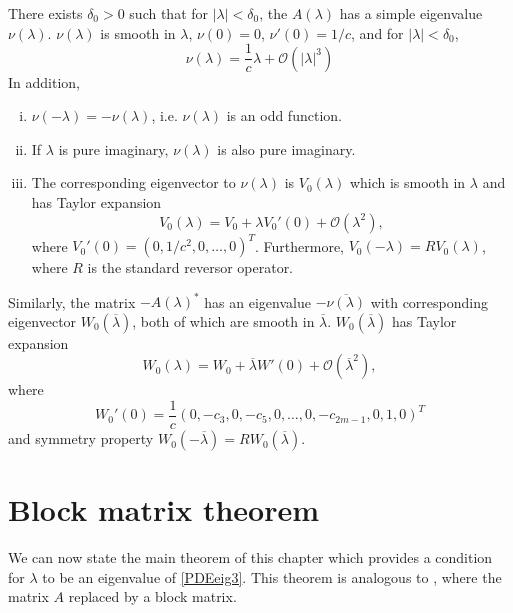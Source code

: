 \documentclass[thesis.tex]{subfiles}
\begin{document}

\begin{lemma}\label{nulambdalemma}
There exists $\delta_0 > 0$ such that for $|\lambda| < \delta_0$, the $A(\lambda)$ has a simple eigenvalue $\nu(\lambda)$. $\nu(\lambda)$ is smooth in $\lambda$, $\nu(0) = 0$, $\nu'(0) = 1/c$, and for $|\lambda| < \delta_0$,
\begin{equation}\label{nulambda}
\nu(\lambda) = \frac{1}{c} \lambda + \mathcal{O}(|\lambda|^3)
\end{equation}
In addition,
\begin{enumerate}[(i)]
\item $\nu(-\lambda) = -\nu(\lambda)$, i.e. $\nu(\lambda)$ is an odd function.
\item If $\lambda$ is pure imaginary, $\nu(\lambda)$ is also pure imaginary.
\item The corresponding eigenvector to $\nu(\lambda)$ is $V_0(\lambda)$ which is smooth in $\lambda$ and has Taylor expansion
\begin{equation}\label{V0expansion}
V_0(\lambda) = V_0 + \lambda V_0'(0) + \mathcal{O}(\lambda^2),
\end{equation}
where $V_0'(0) = (0, 1/c^2, 0, \dots, 0)^T$. Furthermore, $V_0(-\lambda) = R V_0(\lambda)$, where $R$ is the standard reversor operator.
\end{enumerate}

Similarly, the matrix $-A(\lambda)^*$ has an eigenvalue $-\overline{\nu(\lambda)}$ with corresponding eigenvector $W_0(\overline{\lambda})$, both of which are smooth in $\overline{\lambda}$. $W_0(\overline{\lambda})$ has Taylor expansion
\begin{equation}\label{W0expansion}
W_0(\lambda) = W_0 + \overline{\lambda} W'(0) + \mathcal{O}(\overline{\lambda}^2),
\end{equation}
where 
\begin{equation}\label{W0prime}
W_0'(0) = \frac{1}{c} \left( 0, -c_3, 0, -c_5, 0, \dots, 0, -c_{2m-1}, 0, 1, 0\right)^T
\end{equation}
and symmetry property $W_0(-\overline{\lambda}) = R W_0(\overline{\lambda})$.
\end{lemma}

\section{Block matrix theorem}

We can now state the main theorem of this chapter which provides a condition for $\lambda$ to be an eigenvalue of \eqref{PDEeig3}. This theorem is analogous to \cite[Theorem 2]{Sandstede1998}, where the matrix $A$ replaced by a block matrix.
\end{document}
